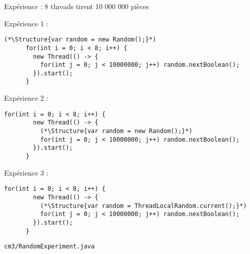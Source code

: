 
\begingroup

\begin{frame}[fragile]{Expérience : 8 threads tirent 10 000 000 pièces}

  \vspace{-3mm}
  \begin{block}{Expérience 1 : }\vspace{-3mm}
    \begin{lstlisting}[gobble=4]
      (*\Structure{var random = new Random();}*)
      for(int i = 0; i < 8; i++) {
        new Thread(() -> {
          for(int j = 0; j < 10000000; j++) random.nextBoolean();
        }).start();
      }
    \end{lstlisting}
  \end{block}

  \vspace{-3mm}
  \begin{block}{Expérience 2 : }\vspace{-3mm}
    \begin{lstlisting}[gobble=4]
      for(int i = 0; i < 8; i++) {
        new Thread(() -> {
          (*\Structure{var random = new Random();}*)
          for(int j = 0; j < 10000000; j++) random.nextBoolean();
        }).start();
      }
    \end{lstlisting}
  \end{block}

  \vspace{-3mm}
  \begin{block}{Expérience 3 : }\vspace{-3mm}
    \begin{lstlisting}[gobble=4]
      for(int i = 0; i < 8; i++) {
        new Thread(() -> {
          (*\Structure{var random = ThreadLocalRandom.current();}*)
          for(int j = 0; j < 10000000; j++) random.nextBoolean();
        }).start();
      }
    \end{lstlisting}
  \end{block}

  \vspace{-3mm}
  \begin{citing}
    \jitem \lstinline{cm3/RandomExperiment.java}
  \end{citing}
\end{frame}

\endgroup
\endinput
